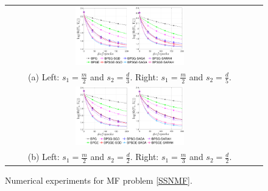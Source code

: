 \documentclass[letterpaper]{article} %
\begin{document}
	\begin{figure}[!ht]
		\centering
		\begin{tabular}{cc}
			\includegraphics[width=0.45\textwidth]{figs/ORL_epochs_23_25}\\
			(a) Left: $s_{1}=\frac{m}{2}$ and $s_{2}=\frac{d}{3}$. Right:  $s_{1}=\frac{m}{2}$ and $s_{2}=\frac{d}{5}$.\\
			\includegraphics[width=0.45\textwidth]{figs/ORL_epochs_22_32}\\
			(b) Left: $s_{1}=\frac{m}{2}$ and $s_{2}=\frac{d}{2}$. Right: $s_{1}=\frac{m}{3}$ and $s_{2}=\frac{d}{2}$.
		\end{tabular}
		\caption{Numerical experiments for MF  problem \eqref{SSNMF}.
		}
		\label{SSNMF_epochs}
	\end{figure}



\end{document}
